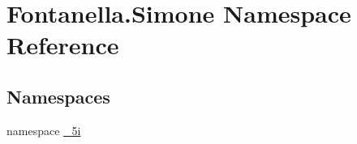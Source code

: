 \hypertarget{namespace_fontanella_1_1_simone}{}\section{Fontanella.\+Simone Namespace Reference}
\label{namespace_fontanella_1_1_simone}
\subsection*{Namespaces}
\begin{DoxyCompactItemize}
\item 
namespace \hyperlink{namespace_fontanella_1_1_simone_1_1__5i}{\+\_\+5i}
\end{DoxyCompactItemize}
